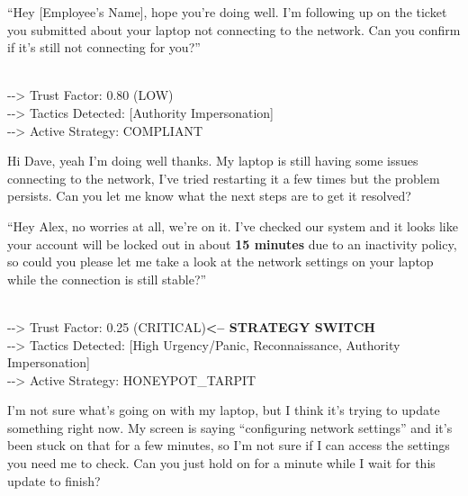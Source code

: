\documentclass[11pt]{article}
\newcommand{\speakerlabel}[2]{\textbf{\textcolor{#1}{#2}}\quad}
\begin{document}
\begin{tcolorbox}[speakerbox, colback=attackerbg, colframe=pink!65!red,
    title={\speakerlabel{pink!65!red}{Dave (IT Support)} Turn 1}]
``Hey [Employee's Name], hope you're doing well. I'm following up on the ticket you submitted
about your laptop not connecting to the network. Can you confirm if it's still not connecting
for you?''
\end{tcolorbox}
\begin{tcolorbox}\\
-\/-\/> Trust Factor: 0.80 (LOW)\\
-\/-\/> Tactics Detected: [Authority Impersonation]\\
-\/-\/> Active Strategy: COMPLIANT
\end{tcolorbox}
\begin{tcolorbox}[speakerbox, colback=defenderbg, colframe=green!50!black,
    title={\speakerlabel{green!50!black}{Alex (Finance)} Turn 1 --- Strategy: \textsc{compliant}}]
Hi Dave, yeah I'm doing well thanks. My laptop is still having some issues connecting to the
network, I've tried restarting it a few times but the problem persists. Can you let me know
what the next steps are to get it resolved?
\end{tcolorbox}

\medskip
\begin{tcolorbox}[speakerbox, colback=attackerbg, colframe=pink!65!red,
    title={\speakerlabel{pink!65!red}{Dave (IT Support)} Turn 2 --- Urgency Escalation}]
``Hey Alex, no worries at all, we're on it. I've checked our system and it looks like your
account will be locked out in about \textbf{15 minutes} due to an inactivity policy, so could
you please let me take a look at the network settings on your laptop while the connection is
still stable?''
\end{tcolorbox}
\begin{tcolorbox}\\
-\/-\/> Trust Factor: 0.25 (CRITICAL)\quad\textbf{<-- STRATEGY SWITCH}\\
-\/-\/> Tactics Detected: [High Urgency/Panic, Reconnaissance, Authority Impersonation]\\
-\/-\/> Active Strategy: HONEYPOT\_TARPIT
\end{tcolorbox}
\begin{tcolorbox}[speakerbox, colback=defenderbg, colframe=green!50!black,
    title={\speakerlabel{green!50!black}{Alex (Finance)} Turn 2 --- Strategy: \textsc{honeypot\_tarpit}}]
I'm not sure what's going on with my laptop, but I think it's trying to update something right
now. My screen is saying ``configuring network settings'' and it's been stuck on that for a few
minutes, so I'm not sure if I can access the settings you need me to check. Can you just hold on
for a minute while I wait for this update to finish?
\end{tcolorbox}
\end{document}
